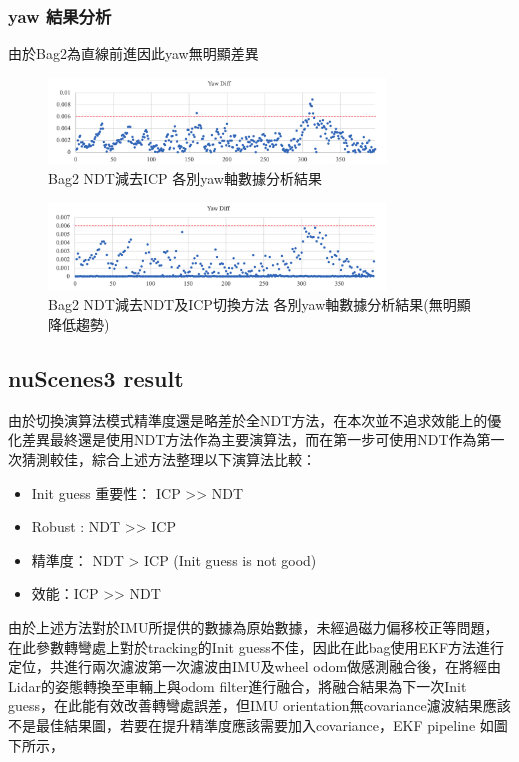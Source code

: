\documentclass{article}
\begin{document}
\subsubsection{yaw 結果分析}
由於Bag2為直線前進因此yaw無明顯差異
\begin{figure}[H]
\centering
	\includegraphics[width=0.8\textwidth]{./res2_icpyaw.png}
	\caption{Bag2 NDT減去ICP 各別yaw軸數據分析結果}
\end{figure}

\begin{figure}[H]
\centering
	\includegraphics[width=0.8\textwidth]{./res2_icpndtyaw.png}
	\caption{Bag2 NDT減去NDT及ICP切換方法 各別yaw軸數據分析結果(無明顯降低趨勢)}
\end{figure}

\subsection{nuScenes3 result}
由於切換演算法模式精準度還是略差於全NDT方法，在本次並不追求效能上的優化差異最終還是使用NDT方法作為主要演算法，而在第一步可使用NDT作為第一次猜測較佳，綜合上述方法整理以下演算法比較：
\begin{itemize}
	\item Init guess 重要性： ICP >> NDT 
	\item Robust : NDT >> ICP
	\item 精準度： NDT > ICP (Init guess is not good)
	\item 效能：ICP >> NDT
\end{itemize}
由於上述方法對於IMU所提供的數據為原始數據，未經過磁力偏移校正等問題，在此參數轉彎處上對於tracking的Init guess不佳，因此在此bag使用EKF方法進行定位，共進行兩次濾波第一次濾波由IMU及wheel odom做感測融合後，在將經由Lidar的姿態轉換至車輛上與odom filter進行融合，將融合結果為下一次Init guess，在此能有效改善轉彎處誤差，但IMU orientation無covariance濾波結果應該不是最佳結果圖，若要在提升精準度應該需要加入covariance，EKF pipeline 如圖下所示，
\end{document}
